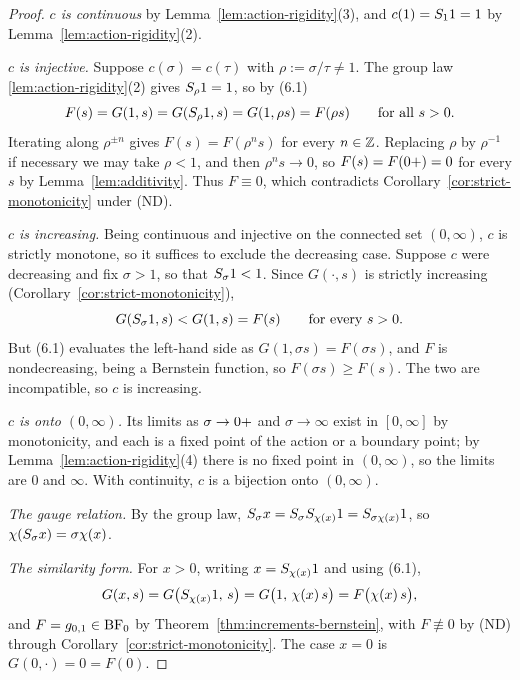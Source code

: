 \begin{proof}
\emph{$c$ is continuous} by Lemma~\ref{lem:action-rigidity}(3), and $c(1) = S_1 1 = 1$ by
Lemma~\ref{lem:action-rigidity}(2).

\emph{$c$ is injective.} Suppose $c(\sigma) = c(\tau)$ with $\rho := \sigma/\tau \ne 1$. The
group law \ref{lem:action-rigidity}(2) gives $S_\rho 1 = 1$, so by (6.1)
\[
  F(s) = G(1,s) = G(S_\rho 1, s) = G(1, \rho s) = F(\rho s)
  \qquad \text{for all } s > 0 .
\]
Iterating along $\rho^{\pm n}$ gives $F(s) = F(\rho^n s)$ for every $n \in \mathbb{Z}$. Replacing
$\rho$ by $\rho^{-1}$ if necessary we may take $\rho < 1$, and then $\rho^n s \to 0$, so
$F(s) = F(0{+}) = 0$ for every $s$ by Lemma~\ref{lem:additivity}. Thus $F \equiv 0$, which
contradicts Corollary~\ref{cor:strict-monotonicity} under (ND).

\emph{$c$ is increasing.} Being continuous and injective on the connected set $(0,\infty)$,
$c$ is strictly monotone, so it suffices to exclude the decreasing case. Suppose $c$ were
decreasing and fix $\sigma > 1$, so that $S_\sigma 1 < 1$. Since $G(\cdot, s)$ is strictly
increasing (Corollary~\ref{cor:strict-monotonicity}),
\[
  G(S_\sigma 1, s) < G(1,s) = F(s) \qquad \text{for every } s > 0 .
\]
But (6.1) evaluates the left-hand side as $G(1,\sigma s) = F(\sigma s)$, and $F$ is
nondecreasing, being a Bernstein function, so $F(\sigma s) \ge F(s)$. The two are
incompatible, so $c$ is increasing.

\emph{$c$ is onto $(0,\infty)$.} Its limits as $\sigma \to 0{+}$ and $\sigma \to \infty$ exist
in $[0,\infty]$ by monotonicity, and each is a fixed point of the action or a boundary point;
by Lemma~\ref{lem:action-rigidity}(4) there is no fixed point in $(0,\infty)$, so the limits
are $0$ and $\infty$. With continuity, $c$ is a bijection onto $(0,\infty)$.

\emph{The gauge relation.} By the group law, $S_\sigma x = S_\sigma S_{\chi(x)} 1
= S_{\sigma\chi(x)} 1$, so $\chi(S_\sigma x) = \sigma\chi(x)$.

\emph{The similarity form.} For $x > 0$, writing $x = S_{\chi(x)} 1$ and using (6.1),
\[
  G(x, s) = G\bigl(S_{\chi(x)} 1,\, s\bigr) = G\bigl(1,\, \chi(x)\, s\bigr)
  = F\bigl(\chi(x)\,s\bigr),
\]
and $F = g_{0,1} \in \mathrm{BF}_0$ by Theorem~\ref{thm:increments-bernstein}, with $F \not\equiv 0$ by
(ND) through Corollary~\ref{cor:strict-monotonicity}. The case $x = 0$ is
$G(0,\cdot) = 0 = F(0)$.
\end{proof}

